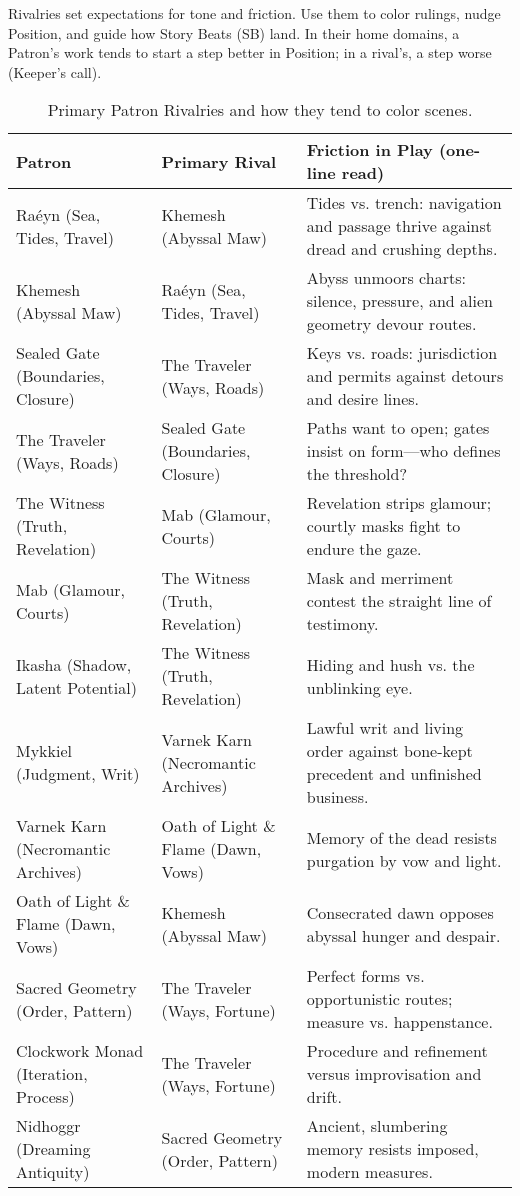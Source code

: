 Rivalries set expectations for tone and friction. Use them to color rulings, nudge Position, and guide how Story Beats (SB) land. In their home domains, a Patron’s work tends to start a step better in Position; in a rival’s, a step worse (Keeper’s call).

\begin{table}[h!]
  \centering
  \renewcommand{\arraystretch}{1.15}
  \begin{tabular}{@{}p{3.4cm}p{3.4cm}p{8.2cm}@{}}
    \toprule
    \textbf{Patron} & \textbf{Primary Rival} & \textbf{Friction in Play (one-line read)} \\
    \midrule
    Raéyn (Sea, Tides, Travel) & Khemesh (Abyssal Maw) & Tides vs. trench: navigation and passage thrive against dread and crushing depths. \\
    Khemesh (Abyssal Maw) & Raéyn (Sea, Tides, Travel) & Abyss unmoors charts: silence, pressure, and alien geometry devour routes. \\
    Sealed Gate (Boundaries, Closure) & The Traveler (Ways, Roads) & Keys vs. roads: jurisdiction and permits against detours and desire lines. \\
    The Traveler (Ways, Roads) & Sealed Gate (Boundaries, Closure) & Paths want to open; gates insist on form—who defines the threshold? \\
    The Witness (Truth, Revelation) & Mab (Glamour, Courts) & Revelation strips glamour; courtly masks fight to endure the gaze. \\
    Mab (Glamour, Courts) & The Witness (Truth, Revelation) & Mask and merriment contest the straight line of testimony. \\
    Ikasha (Shadow, Latent Potential) & The Witness (Truth, Revelation) & Hiding and hush vs. the unblinking eye. \\
    Mykkiel (Judgment, Writ) & Varnek Karn (Necromantic Archives) & Lawful writ and living order against bone-kept precedent and unfinished business. \\
    Varnek Karn (Necromantic Archives) & Oath of Light \& Flame (Dawn, Vows) & Memory of the dead resists purgation by vow and light. \\
    Oath of Light \& Flame (Dawn, Vows) & Khemesh (Abyssal Maw) & Consecrated dawn opposes abyssal hunger and despair. \\
    Sacred Geometry (Order, Pattern) & The Traveler (Ways, Fortune) & Perfect forms vs. opportunistic routes; measure vs. happenstance. \\
    Clockwork Monad (Iteration, Process) & The Traveler (Ways, Fortune) & Procedure and refinement versus improvisation and drift. \\
    Nidhoggr (Dreaming Antiquity) & Sacred Geometry (Order, Pattern) & Ancient, slumbering memory resists imposed, modern measures. \\
    \bottomrule
  \end{tabular}
  \caption{Primary Patron Rivalries and how they tend to color scenes.}
\end{table}
